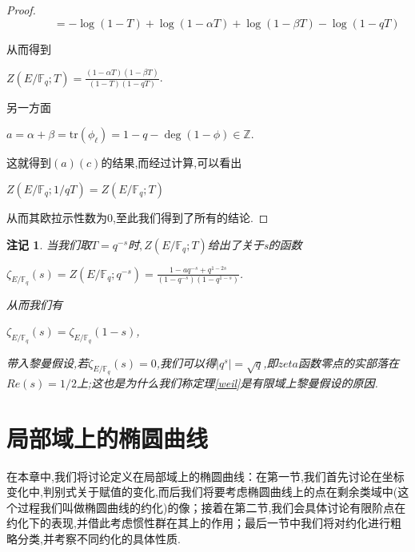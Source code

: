 \documentclass[11pt]{ctexart}
\DeclareMathOperator{\Deg}{deg}
\newtheorem{rem}{注记}[section]
\begin{document}
\begin{proof}
    $~~~~~~~~~~~~~~~~~~~=-\log(1-T)+\log(1-\alpha T)+\log(1-\beta T)-\log(1-qT)$

\noindent 从而得到
\begin{center}
    $Z(E/\mathbb{F}_q;T)=\frac{(1-\alpha T)(1-\beta T)}{(1-T)(1-qT)}$.
\end{center}
另一方面
\begin{center}
    $a=\alpha+\beta=$tr$(\phi_{\ell})=1-q-\Deg(1-\phi)\in \mathbb{Z}$.
\end{center}
这就得到$(a)(c)$的结果,而经过计算,可以看出
\begin{center}
    $Z(E/\mathbb{F}_q;1/qT)= Z(E/\mathbb{F}_q;T)$
\end{center}
从而其欧拉示性数为0,至此我们得到了所有的结论.
\end{proof}
\begin{rem}当我们取$T=q^{-s}$时$,Z(E/\mathbb{F}_q;T)$给出了关于s的函数
    \begin{center}
        $\zeta_{E/\mathbb{F}_q}(s)= Z(E/\mathbb{F}_q;q^{-s})=\frac{1-aq^{-s}+q^{1-2s}}{(1-q^{-s})(1-q^{1-s})}$.
    \end{center}
    从而我们有
    \begin{center}
        $\zeta_{E/\mathbb{F}_q}(s)=\zeta_{E/\mathbb{F}_q}(1-s)$,
    \end{center} 
    带入黎曼假设,若$\zeta_{E/\mathbb{F}_q}(s)=0$,我们可以得$|q^{s}|=\sqrt{q}$,即$zeta$函数零点的实部落在$Re(s)=1/2$上;这也是为什么我们称定理\ref{weil}是有限域上黎曼假设的原因.

\end{rem}










\section{局部域上的椭圆曲线}
在本章中,我们将讨论定义在局部域上的椭圆曲线：在第一节,我们首先讨论在坐标变化中,判别式关于赋值的变化,而后我们将要考虑椭圆曲线上的点在剩余类域中(这个过程我们叫做椭圆曲线的约化)的像；接着在第二节,我们会具体讨论有限阶点在约化下的表现,并借此考虑惯性群在其上的作用；最后一节中我们将对约化进行粗略分类,并考察不同约化的具体性质.
\end{document}
